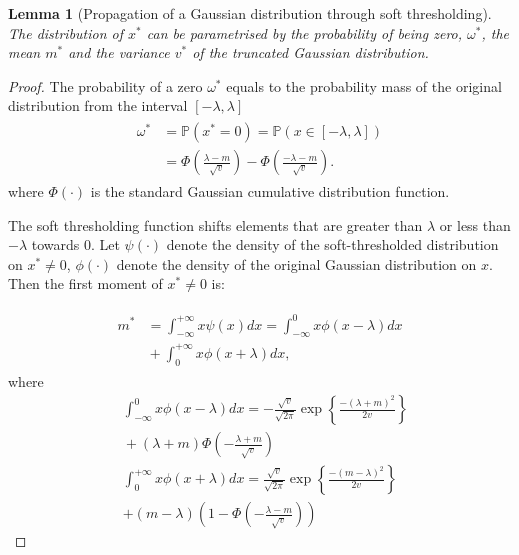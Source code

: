 \documentclass[letterpaper]{article}
\newtheorem{lemma}{Lemma}
\begin{document}
\begin{lemma}[Propagation of a Gaussian distribution through soft thresholding]
\label{thm:soft_thresholding}
The distribution of $x^*$ can be parametrised by the probability of being zero, $\omega^*$, the mean $m^*$ and the variance $v^*$ of the truncated Gaussian distribution.
\end{lemma}
\begin{proof}

The probability of a zero $\omega^*$ equals to the probability mass of the original distribution from the interval $[-\lambda, \lambda]$
\begin{align}
\begin{split}
\omega^* &= \mathbb{P}(x^*=0) = \mathbb{P}(x \in [-\lambda, \lambda]) \\
&= \Phi\left(\frac{\lambda-m}{\sqrt{v}}\right) - \Phi\left(\frac{-\lambda-m}{\sqrt{v}}\right). 
\end{split}
\end{align}
where $\Phi(\cdot)$ is the standard Gaussian cumulative distribution function. 

The soft thresholding function shifts elements that are greater than $\lambda$  or less than $-\lambda$ towards $0$. Let $\psi(\cdot)$ denote the density of the soft-thresholded distribution on $x^* \neq 0$, $\phi(\cdot)$ denote the density of the original Gaussian distribution on $x$. Then the first moment of $x^* \neq 0$ is:

\begin{align}
\label{eq:thr_first_moment}
\begin{split}
m^* &= \int_{-\infty}^{+\infty}x\psi(x)dx= \int_{-\infty}^{0}x\phi(x-\lambda)dx \\
&{} + \int_{0}^{+\infty}x\phi(x+\lambda)dx,
\end{split}
\end{align}
where
\begin{align}
&\int_{-\infty}^{0}x\phi(x-\lambda)dx = -\frac{\sqrt{v}}{\sqrt{2\pi}} \exp\left\{\frac{-(\lambda+m)^2}{2v}\right\} \nonumber\\
&{} + (\lambda+m)\Phi\left(-\frac{\lambda+m}{\sqrt{v}}\right)\\
&\int_{0}^{+\infty}x\phi(x+\lambda)dx = \frac{\sqrt{v}}{\sqrt{2\pi}} \exp\left\{\frac{-(m - \lambda)^2}{2v}\right\}\nonumber\\
& + (m - \lambda)\left(1 - \Phi\left(-\frac{\lambda-m}{\sqrt{v}}\right)\right)
\end{align}


\end{proof}
\end{document}
